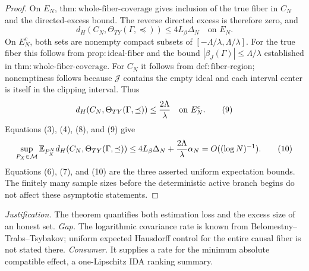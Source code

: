 \documentclass{article}
\begin{document}
\begin{proof}
On \(E_N\), \(\mathrm{thm:whole\text{-}fiber\text{-}coverage}\) gives inclusion of the true fiber in \(C_N\) and the directed-excess bound.  The reverse directed excess is therefore zero, and
\[
 d_H(C_N,\Theta_{TY}(\Gamma,\preceq))
 \le4L_\beta\Delta_N
 \quad\text{on }E_N. \tag{8}
\]
On \(E_N^c\), both sets are nonempty compact subsets of \([ -\Lambda/\lambda,\Lambda/\lambda]\).  For the true fiber this follows from \(\mathrm{prop:ideal\text{-}fiber}\) and the bound \(|\beta_J(\Gamma)|\le\Lambda/\lambda\) established in \(\mathrm{thm:whole\text{-}fiber\text{-}coverage}\).  For \(C_N\) it follows from \(\mathrm{def:fiber\text{-}region}\); nonemptiness follows because \(\mathcal J\) contains the empty ideal and each interval center is itself in the clipping interval.  Thus
\[
 d_H(C_N,\Theta_{TY}(\Gamma,\preceq))
 \le{2\Lambda\over\lambda}
 \quad\text{on }E_N^c. \tag{9}
\]
Equations (3), (4), (8), and (9) give
\[
 \sup_{P_X\in\mathcal M}\mathbb E_{P_X^N}
 d_H(C_N,\Theta_{TY}(\Gamma,\preceq))
 \le4L_\beta\Delta_N+{2\Lambda\over\lambda}\alpha_N
 =O((\log N)^{-1}). \tag{10}
\]
Equations (6), (7), and (10) are the three asserted uniform expectation bounds.  The finitely many sample sizes before the deterministic active branch begins do not affect these asymptotic statements.
\end{proof}
\par\smallskip\noindent \textit{Justification.} The theorem quantifies both estimation loss and the excess size of an honest set. \textit{Gap.} The logarithmic covariance rate is known from Belomestny--Trabs--Tsybakov; uniform expected Hausdorff control for the entire causal fiber is not stated there. \textit{Consumer.} It supplies a rate for the minimum absolute compatible effect, a one-Lipschitz IDA ranking summary.
\end{document}
